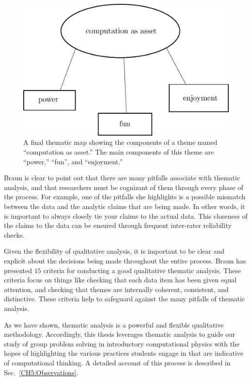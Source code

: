\documentclass{msuphddissertation}
\begin{document}
\begin{doublespace}
\begin{figure}\center
\includegraphics[scale=0.60]{images/CH2Map.pdf}
\caption{A final thematic map showing the components of a theme named ``computation as asset.''  The main components of this theme are ``power,'' ``fun'', and ``enjoyment.''}\label{CH2:Map}
\end{figure}

Braun is clear to point out that there are many pitfalls associate with thematic analysis, and that researchers must be cognizant of them through every phase of the process.  For example, one of the pitfalls she highlights is a possible mismatch between the data and the analytic claims that are being made.  In other words, it is important to always closely tie your claims to the actual data.  This closeness of the claims to the data can be ensured through frequent inter-rater reliability checks.

Given the flexibility of qualitative analysis, it is important to be clear and explicit about the decisions being made throughout the entire process.  Braun has presented $15$ criteria for conducting a good qualitative thematic analysis.  These criteria focus on things like checking that each data item has been given equal attention, and checking that themes are internally coherent, consistent, and distinctive.  These criteria help to safeguard against the many pitfalls of thematic analysis.

As we have shown, thematic analysis is a powerful and flexible qualitative methodology.  Accordingly, this thesis leverages thematic analysis to guide our study of group problem solving in introductory computational physics with the hopes of highlighting the various practices students engage in that are indicative of computational thinking.  A detailed account of this process is described in Sec.~\ref{CH5:Observations}.


\end{doublespace}
\end{document}
